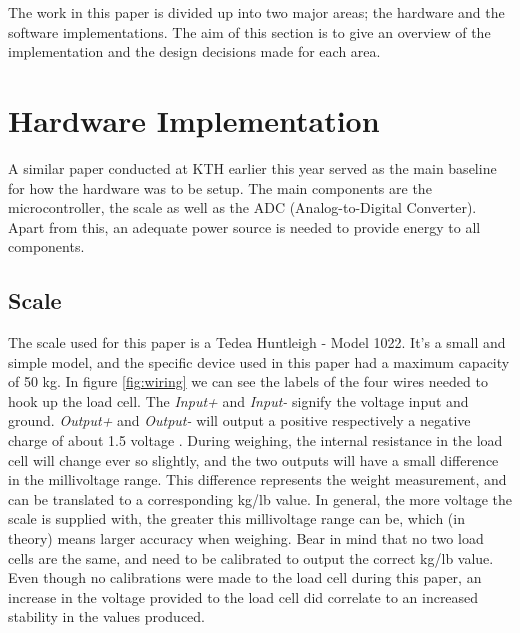 




The work in this paper is divided up into two major areas; the hardware and the software implementations. The aim of this section is to give an overview of the implementation and the design decisions made for each area.

\section{Hardware Implementation}

A similar paper conducted at KTH earlier this year served as the main baseline for how the hardware was to be setup.\cite{hospital} The main components are the microcontroller, the scale as well as the ADC (Analog-to-Digital Converter). Apart from this, an adequate power source is needed to provide energy to all components. 

\subsection{Scale}
The scale used for this paper is a Tedea Huntleigh - Model 1022. It's a small and simple model, and the specific device used in this paper had a maximum capacity of 50 kg.\cite{load-cell-data} In figure \ref{fig:wiring} we can see the labels of the four wires needed to hook up the load cell. The \textit{Input+} and \textit{Input-} signify the voltage input and ground. \cite{load-cell-spec} \textit{Output+} and \textit{Output-} will output a positive respectively a negative charge of about 1.5 voltage . During weighing, the internal resistance in the load cell will change ever so slightly, and the two outputs will have a small difference in the millivoltage range. This difference represents the weight measurement, and can be translated to a corresponding kg/lb value. In general, the more voltage the scale is supplied with, the greater this millivoltage range can be, which (in theory) means larger accuracy when weighing. Bear in mind that no two load cells are the same, and need to be calibrated to output the correct kg/lb value. Even though no calibrations were made to the load cell during this paper, an increase in the voltage provided to the load cell did correlate to an increased stability in the values produced. 

